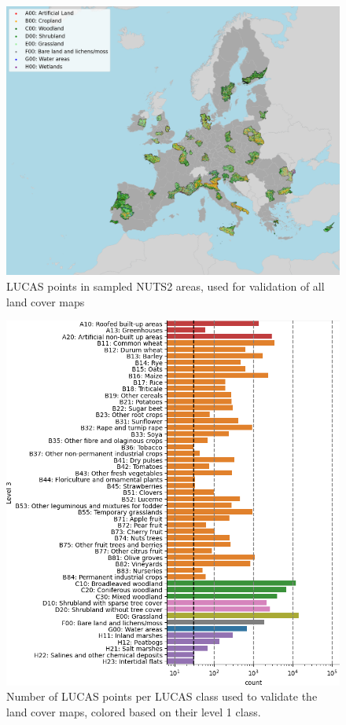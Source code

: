     \begin{figure}[h]
        \centering
        \includegraphics[width=\textwidth]{figs_05/fig_lucas_aoi.png}
        \caption{LUCAS points in sampled NUTS2 areas, used for validation of all land cover maps}
        \label{fig:05_lucas_aoi}
    \end{figure}
    
    \begin{figure}[h]
        \centering
        \includegraphics[width=\textwidth]{figs_05/fig_lucas_aoi_counts.png}
        \caption{Number of LUCAS points per LUCAS class used to validate the land cover maps, colored based on their level 1 class.}
        \label{fig:05_lucas_aoi_counts}
    \end{figure}

